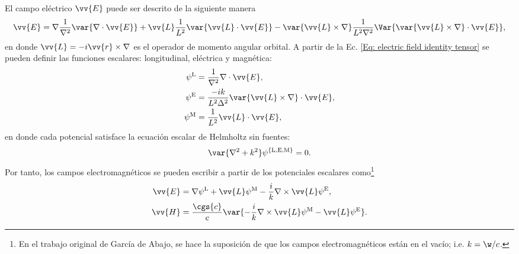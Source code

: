 El campo eléctrico $\vv{E}$ puede ser descrito de la siguiente manera \cite{Low}
\begin{equation}
\vv{E} = \nabla \frac{1}{\nabla^2}\var{\nabla\cdot\vv{E}} + \vv{L}\frac{1}{L^2}\var{\vv{L}\cdot\vv{E}}-\var{\vv{L}\times\nabla}\frac{1}{L^2\nabla^2}\Var{ \var{\vv{L}\times\nabla}\cdot\vv{E}},
\label{Eq: electric field identity tensor}
\end{equation}
en donde $\vv{L}=-i\vv{r}\times\nabla$ es el operador de momento angular orbital. A partir de la Ec. \eqref{Eq: electric field identity tensor} se pueden definir las funciones escalares: longitudinal, eléctrica y magnética: \cite{Low}
\begin{align}
\psi^{\rm L} &= \frac{1}{\nabla^2} \nabla\cdot \vv{E}, \\
\psi^{\rm E} &= \frac{-i k}{L^2 \Delta^2}\var{\vv{L}\times\nabla}\cdot\vv{E}, \\
\psi^{\rm M} &= \frac{1}{L^2}\vv{L}\cdot\vv{E},
\end{align}
en donde cada potencial satisface la ecuación escalar de Helmholtz sin fuentes:
\begin{equation}
\var{\nabla^2 + k^2}\psi^{\{\rm L,E,M\}}=0.
\end{equation}
Por tanto, los campos electromagnéticos se pueden escribir a partir de los potenciales escalares como\footnote{En el trabajo original de García de Abajo, se hace la suposición de que los campos electromagnéticos están en el vacío; i.e. $k = \w /c$.}
\begin{align}
\vv{E} &= \nabla\psi^{\rm L} + \vv{L}\psi^{\rm M}-\frac{i}{k}\nabla\times\vv{L}\psi^{\rm E},\\
\vv{H} &= \frac{\cgs{c}}{c}\var{-\frac{i}{k}\nabla\times\vv{L}\psi^{\rm M}-\vv{L}\psi^{\rm E}}.
\end{align} 

